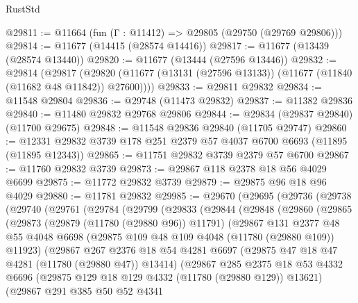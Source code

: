 \begin{lexlean}{RustStd}
\begin{coremodule}
@29811 := @11664 (fun (Γ : @11412) => @29805 (@29750 (@29769 @29806)))
@29814 := @11677 (@14415 (@28574 @14416))
@29817 := @11677 (@13439 (@28574 @13440))
@29820 := @11677 (@13444 (@27596 @13446))
@29832 := @29814
    (@29817 (@29820 (@11677 (@13131 (@27596 @13133)) (@11677 (@11840 (@11682 @48 @11842)) @27600))))
@29833 := @29811 @29832
@29834 := @11548 @29804
@29836 := @29748 (@11473 @29832)
@29837 := @11382 @29836
@29840 := @11480 @29832 @29768 @29806
@29844 := @29834 (@29837 @29840) (@11700 @29675)
@29848 := @11548 @29836 @29840 (@11705 @29747)
@29860 := @12331 @29832 @3739 @178 @251 @2379 @57 @4037 @6700 @6693 (@11895 (@11895 @12343))
@29865 := @11751 @29832 @3739 @2379 @57 @6700
@29867 := @11760 @29832 @3739
@29873 := @29867 @118 @2378 @18 @56 @4029 @6699
@29875 := @11772 @29832 @3739
@29879 := @29875 @96 @18 @96 @4029
@29880 := @11781 @29832
@29985 := @29670
    (@29695
      (@29736
        (@29738
          (@29740
            (@29761
              (@29784
                (@29799
                  (@29833
                    (@29844
                      (@29848
                        (@29860
                          (@29865
                            (@29873
                              (@29879 (@11780 (@29880 @96)) @11791)
                              (@29867
                                @131
                                @2377
                                @48
                                @55
                                @4048
                                @6698
                                (@29875 @109 @48 @109 @4048 (@11780 (@29880 @109)) @11923)
                                (@29867
                                  @267
                                  @2376
                                  @18
                                  @54
                                  @4281
                                  @6697
                                  (@29875 @47 @18 @47 @4281 (@11780 (@29880 @47)) @13414)
                                  (@29867
                                    @285
                                    @2375
                                    @18
                                    @53
                                    @4332
                                    @6696
                                    (@29875 @129 @18 @129 @4332 (@11780 (@29880 @129)) @13621)
                                    (@29867
                                      @291
                                      @385
                                      @50
                                      @52
                                      @4341

\end{coremodule}
\end{lexlean}
